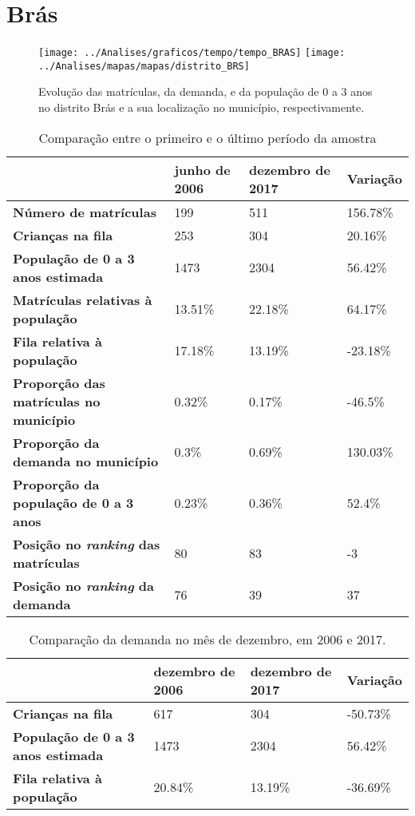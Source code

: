 \section{Brás}
\begin{figure}[H]
	\centering
	\texttt{[image: ../Analises/graficos/tempo/tempo\_BRAS]}
	\texttt{[image: ../Analises/mapas/mapas/distrito\_BRS]}
	\caption{Evolução das matrículas, da demanda, e da população de 0 a 3 anos no distrito Brás e a sua localização no município, respectivamente.}
\end{figure}
\begin{table}[H]
	\begin{tabular}{|l|l|l|l|}
		\hline
		\textbf{}                                      & \textbf{junho de 2006}       & \textbf{dezembro de 2017}    & \textbf{Variação} \\ \hline
		\textbf{Número de matrículas}                  & 199 & 511 & 156.78\% \\ \hline
		\textbf{Crianças na fila}                      & 253 & 304 & 20.16\% \\ \hline
		\textbf{População de 0 a 3 anos estimada}      & 1473 & 2304 & 56.42\% \\ \hline
		\textbf{Matrículas relativas à população}      & 13.51\% & 22.18\% & 64.17\% \\ \hline
		\textbf{Fila relativa à população}             & 17.18\% & 13.19\% & -23.18\% \\ \hline
		\textbf{Proporção das matrículas no município} & 0.32\% & 0.17\% & -46.5\% \\ \hline
		\textbf{Proporção da demanda no município}     & 0.3\% & 0.69\% & 130.03\% \\ \hline
		\textbf{Proporção da população de 0 a 3 anos}  & 0.23\% & 0.36\% & 52.4\% \\ \hline
		\textbf{Posição no \textit{ranking} das matrículas}     & 80 & 83 & -3 \\ \hline
		\textbf{Posição no \textit{ranking} da demanda}         & 76 & 39 & 37 \\ \hline
	\end{tabular}
	\caption{Comparação entre o primeiro e o último período da amostra}
\end{table}
\begin{table}[H]
	\begin{tabular}{|l|l|l|l|}
		\hline
		\textbf{}                                 & \textbf{dezembro de 2006} & \textbf{dezembro de 2017} & \textbf{Variação} \\ \hline
		\textbf{Crianças na fila}                      & 617 & 304 & -50.73\% \\ \hline
		\textbf{População de 0 a 3 anos estimada}      & 1473 & 2304 & 56.42\% \\ \hline
		\textbf{Fila relativa à população}             & 20.84\% & 13.19\% & -36.69\% \\ \hline
	\end{tabular}
	\caption{Comparação da demanda no mês de dezembro, em 2006 e 2017.}
\end{table}
